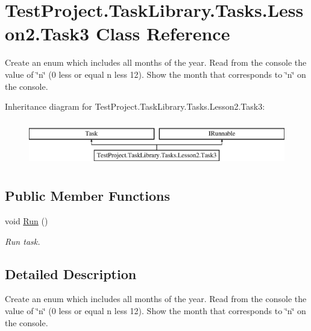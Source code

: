 \hypertarget{class_test_project_1_1_task_library_1_1_tasks_1_1_lesson2_1_1_task3}{}\section{Test\+Project.\+Task\+Library.\+Tasks.\+Lesson2.\+Task3 Class Reference}
\label{class_test_project_1_1_task_library_1_1_tasks_1_1_lesson2_1_1_task3}


Create an enum which includes all months of the year. Read from the console the value of \char`\"{}n\char`\"{} (0 less or equal n less 12). Show the month that corresponds to \char`\"{}n\char`\"{} on the console.  


Inheritance diagram for Test\+Project.\+Task\+Library.\+Tasks.\+Lesson2.\+Task3\+:\begin{figure}[H]
\begin{center}
\leavevmode
\includegraphics[height=2.000000cm]{class_test_project_1_1_task_library_1_1_tasks_1_1_lesson2_1_1_task3}
\end{center}
\end{figure}
\subsection*{Public Member Functions}
\begin{DoxyCompactItemize}
\item 
void \mbox{\hyperlink{class_test_project_1_1_task_library_1_1_tasks_1_1_lesson2_1_1_task3_af4240900823a5d8e625f514a3261aefd}{Run}} ()
\begin{DoxyCompactList}\small\item\em Run task. \end{DoxyCompactList}\end{DoxyCompactItemize}


\subsection{Detailed Description}
Create an enum which includes all months of the year. Read from the console the value of \char`\"{}n\char`\"{} (0 less or equal n less 12). Show the month that corresponds to \char`\"{}n\char`\"{} on the console. 



